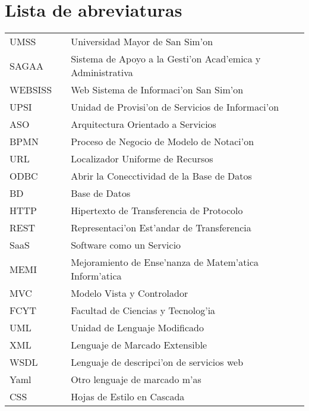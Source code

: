 \chapter{Lista de abreviaturas}

\begin{center}
\begin{tabular}{lcl}
UMSS   &              & Universidad Mayor de San Sim'on \\
SAGAA   &                & Sistema de Apoyo a la Gesti'on Acad'emica y Administrativa\\
WEBSISS  &              & Web Sistema de Informaci'on San Sim'on\\
UPSI	&				& Unidad de Provisi'on de Servicios de Informaci'on\\
ASO		&				& Arquitectura Orientado a Servicios\\
BPMN	&				& Proceso de Negocio de Modelo de Notaci'on\\
URL 	&				& Localizador Uniforme de Recursos\\
ODBC	&				& Abrir la Conecctividad de la Base de Datos\\
BD 		&				& Base de Datos\\
HTTP	&				& Hipertexto de Transferencia de Protocolo\\
REST	&				& Representaci'on Est'andar de Transferencia\\
SaaS	&				& Software como un Servicio\\
MEMI	&				& Mejoramiento de Ense'nanza de Matem'atica Inform'atica\\
MVC		&				& Modelo Vista y Controlador\\
FCYT    &				& Facultad de Ciencias y Tecnolog'ia\\
UML		&				& Unidad de Lenguaje Modificado\\
XML		&				& Lenguaje de Marcado Extensible\\
WSDL	&				& Lenguaje de descripci'on de servicios web\\
Yaml	&				& Otro lenguaje de marcado m'as\\
CSS		&				& Hojas de Estilo en Cascada\\





\end{tabular}
\end{center}